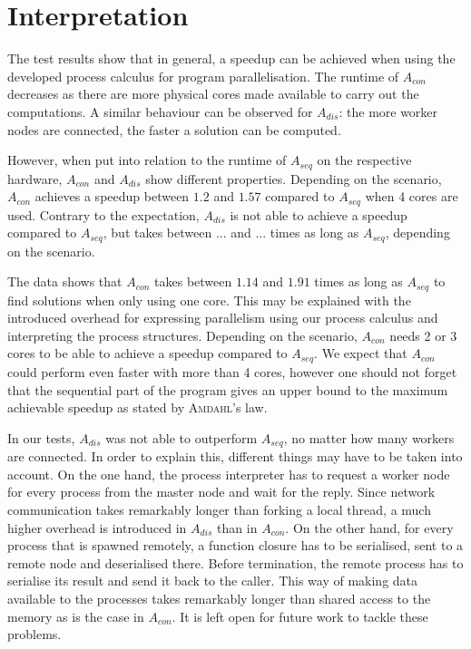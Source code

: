 \clearpage
\section{Interpretation}
The test results show that in general, a speedup can be achieved when using the developed process calculus for program parallelisation. The runtime of $A_{con}$ decreases as there are more physical cores made available to carry out the computations. A similar behaviour can be observed for $A_{dis}$: the more worker nodes are connected, the faster a solution can be computed.

However, when put into relation to the runtime of $A_{seq}$ on the respective hardware, $A_{con}$ and $A_{dis}$ show different properties. Depending on the scenario, $A_{con}$ achieves a speedup between $1.2$ and $1.57$ compared to $A_{seq}$ when 4 cores are used. Contrary to the expectation, $A_{dis}$ is not able to achieve a speedup compared to $A_{seq}$, but takes between ... and ... times as long as $A_{seq}$, depending on the scenario.

The data shows that $A_{con}$ takes between $1.14$ and $1.91$ times as long as $A_{seq}$ to find solutions when only using one core. This may be explained with the introduced overhead for expressing parallelism using our process calculus and interpreting the process structures. Depending on the scenario, $A_{con}$ needs 2 or 3 cores to be able to achieve a speedup compared to $A_{seq}$. We expect that $A_{con}$ could perform even faster with more than 4 cores, however one should not forget that the sequential part of the program gives an upper bound to the maximum achievable speedup as stated by \textsc{Amdahl}'s law.

In our tests, $A_{dis}$ was not able to outperform $A_{seq}$, no matter how many workers are connected. In order to explain this, different things may have to be taken into account. On the one hand, the process interpreter has to request a worker node for every process from the master node and wait for the reply. Since network communication takes remarkably longer than forking a local thread, a much higher overhead is introduced in $A_{dis}$ than in $A_{con}$. On the other hand, for every process that is spawned remotely, a function closure has to be serialised, sent to a remote node and deserialised there. Before termination, the remote process has to serialise its result and send it back to the caller. This way of making data available to the processes takes remarkably longer than shared access to the memory as is the case in $A_{con}$. It is left open for future work to tackle these problems.
